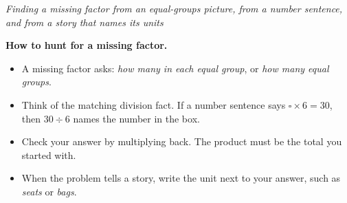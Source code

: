 \documentclass[12pt]{article}
\begin{document}

\begin{center}
\textit{Finding a missing factor from an equal-groups picture, from a number
sentence, and from a story that names its units}
\end{center}

\noindent\textbf{How to hunt for a missing factor.}
\begin{itemize}[leftmargin=1.2cm, itemsep=2pt, topsep=2pt]
\item A missing factor asks: \emph{how many in each equal group}, or
\emph{how many equal groups}.
\item Think of the matching division fact. If a number sentence says
$\square \times 6 = 30$, then $30 \div 6$ names the number in the box.
\item Check your answer by multiplying back. The product must be the total you
started with.
\item When the problem tells a story, write the unit next to your answer, such
as \emph{seats} or \emph{bags}.
\end{itemize}

\vspace{0.2cm}


\end{document}
